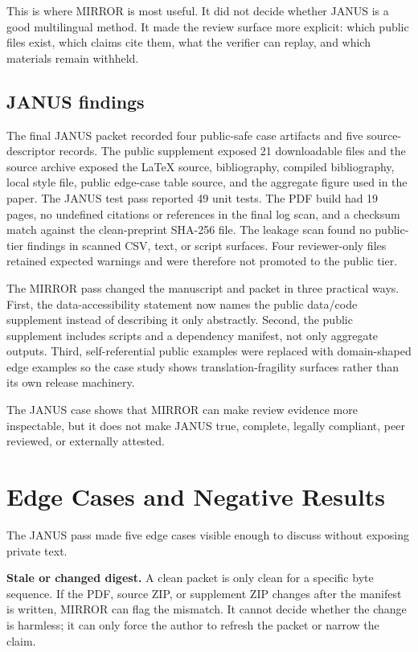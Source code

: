 \documentclass[10pt]{article}
\newcommand{\mirror}{MIRROR}
\begin{document}
This is where \mirror{} is most useful. It did not decide whether JANUS is a good multilingual method. It made the review surface more explicit: which public files exist, which claims cite them, what the verifier can replay, and which materials remain withheld.

\subsection{JANUS findings}

The final JANUS packet recorded four public-safe case artifacts and five source-descriptor records. The public supplement exposed 21 downloadable files and the source archive exposed the LaTeX source, bibliography, compiled bibliography, local style file, public edge-case table source, and the aggregate figure used in the paper. The JANUS test pass reported 49 unit tests. The PDF build had 19 pages, no undefined citations or references in the final log scan, and a checksum match against the clean-preprint SHA-256 file. The leakage scan found no public-tier findings in scanned CSV, text, or script surfaces. Four reviewer-only files retained expected warnings and were therefore not promoted to the public tier.

The \mirror{} pass changed the manuscript and packet in three practical ways. First, the data-accessibility statement now names the public data/code supplement instead of describing it only abstractly. Second, the public supplement includes scripts and a dependency manifest, not only aggregate outputs. Third, self-referential public examples were replaced with domain-shaped edge examples so the case study shows translation-fragility surfaces rather than its own release machinery.

The JANUS case shows that \mirror{} can make review evidence more inspectable, but it does not make JANUS true, complete, legally compliant, peer reviewed, or externally attested.

\section{Edge Cases and Negative Results}

The JANUS pass made five edge cases visible enough to discuss without exposing private text.

\textbf{Stale or changed digest.} A clean packet is only clean for a specific byte sequence. If the PDF, source ZIP, or supplement ZIP changes after the manifest is written, \mirror{} can flag the mismatch. It cannot decide whether the change is harmless; it can only force the author to refresh the packet or narrow the claim.
\end{document}
